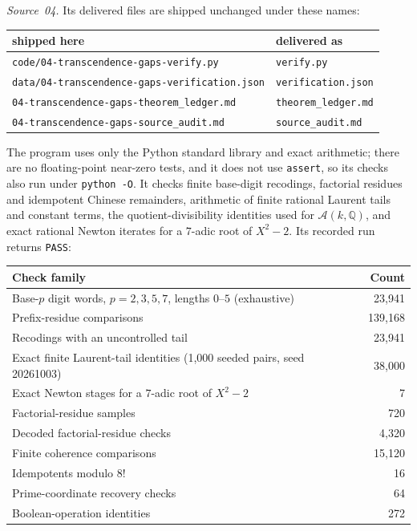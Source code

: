 \documentclass[11pt]{article}
\theoremstyle{definition}
\theoremstyle{remark}
\newcommand{\Q}{\mathbb{Q}}
\newcommand{\Asc}{\mathcal{A}}
\newcommand{\fn}[1]{\nolinkurl{#1}}
\begin{document}
\emph{Source~04.} Its delivered files are shipped unchanged under these
names:
\begin{center}\small
\begin{tabular}{@{}ll@{}}
\toprule
shipped here & delivered as\\
\midrule
\fn{code/04-transcendence-gaps-verify.py} & \fn{verify.py}\\
\fn{data/04-transcendence-gaps-verification.json} & \fn{verification.json}\\
\fn{04-transcendence-gaps-theorem_ledger.md} & \fn{theorem_ledger.md}\\
\fn{04-transcendence-gaps-source_audit.md} & \fn{source_audit.md}\\
\bottomrule
\end{tabular}
\end{center}
The program uses only the Python standard library and exact arithmetic;
there are no floating-point near-zero tests, and it does not use
\texttt{assert}, so its checks also run under \texttt{python -O}. It checks
finite base-digit recodings, factorial residues and idempotent Chinese
remainders, arithmetic of finite rational Laurent tails and constant terms,
the quotient-divisibility identities used for $\Asc(k,\Q)$, and exact
rational Newton iterates for a $7$-adic root of $X^2-2$. Its recorded run
returns \texttt{PASS}:
\begin{center}\small
\begin{tabular}{@{}p{}r@{}}
\toprule
Check family & Count\\
\midrule
Base-$p$ digit words, $p=2,3,5,7$, lengths $0$--$5$ (exhaustive) & 23,941\\
Prefix-residue comparisons & 139,168\\
Recodings with an uncontrolled tail & 23,941\\
Exact finite Laurent-tail identities (1,000 seeded pairs, seed 20261003) & 38,000\\
Exact Newton stages for a $7$-adic root of $X^2-2$ & 7\\
Factorial-residue samples & 720\\
Decoded factorial-residue checks & 4,320\\
Finite coherence comparisons & 15,120\\
Idempotents modulo $8!$ & 16\\
Prime-coordinate recovery checks & 64\\
Boolean-operation identities & 272\\
\bottomrule
\end{tabular}
\end{center}
\end{document}
